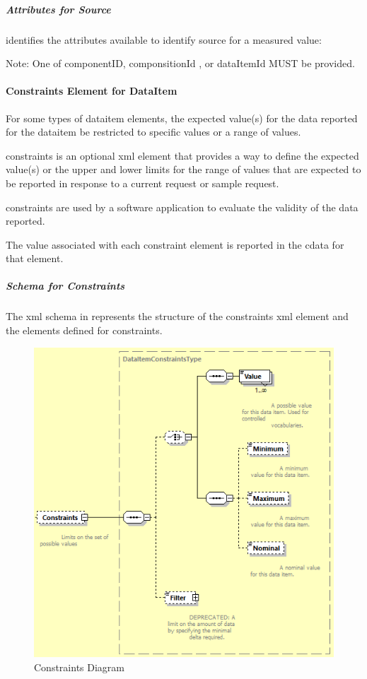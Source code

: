 \subparagraph{Attributes for Source} \mbox{}

 identifies the attributes available to identify \gls{source} for a measured value:



\begin{note}
Note: \notesign One of componentID, componsitionId , or dataItemId MUST be provided.

\end{note}


\paragraph{Constraints Element for DataItem}\mbox{}

For some types of \gls{dataitem} elements, the expected value(s) for the data reported for the \gls{dataitem} \may be restricted to specific values or a range of values.

\gls{constraints} is an optional \gls{xml} element that provides a way to define the expected value(s) or the upper and lower limits for the range of values that are expected to be reported in response to a \gls{current request} or \gls{sample request}.

\gls{constraints} are used by a software application to evaluate the validity of the data reported.

The value associated with each \gls{constraint} element is reported in the \gls{cdata} for that element.

\subparagraph{Schema for Constraints} \mbox{}

The \gls{xml} schema in  represents the structure of the \gls{constraints} \gls{xml} element and the elements defined for \gls{constraints}.

\begin{figure}[ht]
  \centering
  \includegraphics[width=.75\textwidth]{figures/constraints-schema-diagram.png}
  \caption{Constraints Diagram}
  \label{fig:constraints-schema-diagram}
\end{figure}
\FloatBarrier

